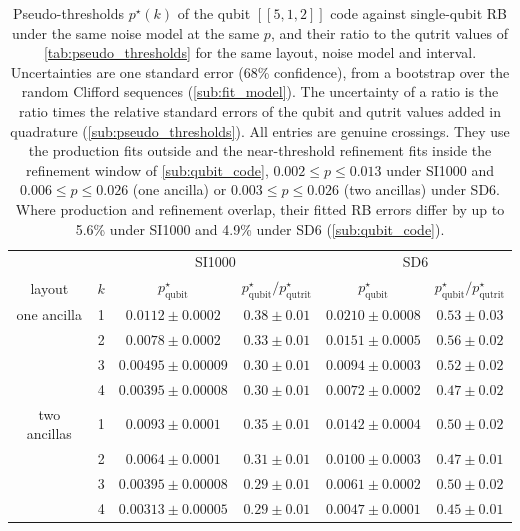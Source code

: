 \begin{table}[htb]
  \centering
  \begin{tabular}{cc|cc|cc}
    \hline
    & & \multicolumn{2}{c|}{SI1000} & \multicolumn{2}{c}{SD6} \\
    layout & $k$ & $p^\star_{\mathrm{qubit}}$ & $p^\star_{\mathrm{qubit}}/p^\star_{\mathrm{qutrit}}$ & $p^\star_{\mathrm{qubit}}$ & $p^\star_{\mathrm{qubit}}/p^\star_{\mathrm{qutrit}}$ \\
    \hline
    one ancilla & 1 & $0.0112 \pm 0.0002$ & $0.38 \pm 0.01$ & $0.0210 \pm 0.0008$ & $0.53 \pm 0.03$ \\
    & 2 & $0.0078 \pm 0.0002$ & $0.33 \pm 0.01$ & $0.0151 \pm 0.0005$ & $0.56 \pm 0.02$ \\
    & 3 & $0.00495 \pm 0.00009$ & $0.30 \pm 0.01$ & $0.0094 \pm 0.0003$ & $0.52 \pm 0.02$ \\
    & 4 & $0.00395 \pm 0.00008$ & $0.30 \pm 0.01$ & $0.0072 \pm 0.0002$ & $0.47 \pm 0.02$ \\
    \hline
    two ancillas & 1 & $0.0093 \pm 0.0001$ & $0.35 \pm 0.01$ & $0.0142 \pm 0.0004$ & $0.50 \pm 0.02$ \\
    & 2 & $0.0064 \pm 0.0001$ & $0.31 \pm 0.01$ & $0.0100 \pm 0.0003$ & $0.47 \pm 0.01$ \\
    & 3 & $0.00395 \pm 0.00008$ & $0.29 \pm 0.01$ & $0.0061 \pm 0.0002$ & $0.50 \pm 0.02$ \\
    & 4 & $0.00313 \pm 0.00005$ & $0.29 \pm 0.01$ & $0.0047 \pm 0.0001$ & $0.45 \pm 0.01$ \\
    \hline
  \end{tabular}
  \caption{Pseudo-thresholds $p^\star(k)$ of the qubit $[[5,1,2]]$ code against single-qubit RB under the same noise model at the same $p$, and their ratio to the qutrit values of \autoref{tab:pseudo_thresholds} for the same layout, noise model and interval. Uncertainties are one standard error (68\% confidence), from a bootstrap over the random Clifford sequences (\autoref{sub:fit_model}). The uncertainty of a ratio is the ratio times the relative standard errors of the qubit and qutrit values added in quadrature (\autoref{sub:pseudo_thresholds}). All entries are genuine crossings. They use the production fits outside and the near-threshold refinement fits inside the refinement window of \autoref{sub:qubit_code}, $0.002 \le p \le 0.013$ under SI1000 and $0.006 \le p \le 0.026$ (one ancilla) or $0.003 \le p \le 0.026$ (two ancillas) under SD6. Where production and refinement overlap, their fitted RB errors differ by up to 5.6\% under SI1000 and 4.9\% under SD6 (\autoref{sub:qubit_code}).}
  \label{tab:pseudo_thresholds_qubit}
\end{table}

